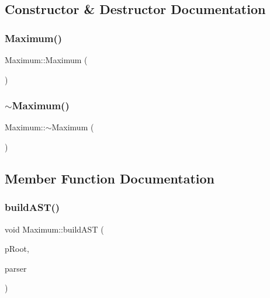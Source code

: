 \subsection{Constructor \& Destructor Documentation}
\mbox{\label{class_maximum_a41816ea834ba28accb734188572e2f5c}} 
\subsubsection{\texorpdfstring{Maximum()}{Maximum()}}
{\footnotesize\ttfamily Maximum\+::\+Maximum (\begin{DoxyParamCaption}{ }\end{DoxyParamCaption})}

\mbox{\label{class_maximum_aa68d9d5f596472b1cb0604399ab599c0}} 
\subsubsection{\texorpdfstring{$\sim$Maximum()}{~Maximum()}}
{\footnotesize\ttfamily Maximum\+::$\sim$\+Maximum (\begin{DoxyParamCaption}{ }\end{DoxyParamCaption})}



\subsection{Member Function Documentation}
\mbox{\label{class_maximum_a55e8a52bc27e2cf0e1d99ca246ff7189}} 
\subsubsection{\texorpdfstring{buildAST()}{buildAST()}}
{\footnotesize\ttfamily void Maximum\+::build\+A\+ST (\begin{DoxyParamCaption}\item[{std\+::unique\+\_\+ptr$<$ \mbox{\hyperlink{class_abstract_expression}{Abstract\+Expression}} $>$ \&}]{p\+Root,  }\item[{\mbox{\hyperlink{class_parser}{Parser}} \&}]{parser }\end{DoxyParamCaption})\hspace{0.3cm}{\ttfamily [virtual]}}



